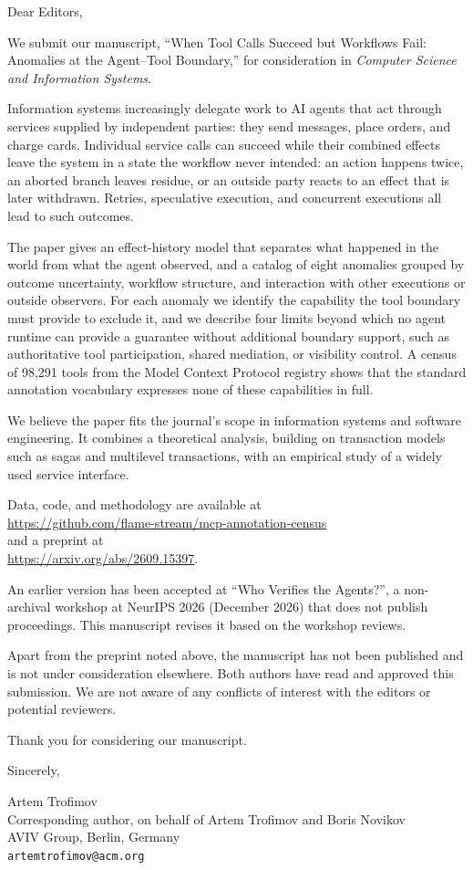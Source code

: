\documentclass[11pt,a4paper]{article}
\begin{document}
\noindent Dear Editors,

We submit our manuscript, ``When Tool Calls Succeed but Workflows Fail:
Anomalies at the Agent--Tool Boundary,'' for consideration in
\emph{Computer Science and Information Systems}.

Information systems increasingly delegate work to AI agents that act
through services supplied by independent parties: they send messages,
place orders, and charge cards. Individual service calls can succeed while
their combined effects leave the system in a state the workflow never
intended: an action happens twice, an aborted branch leaves residue, or an
outside party reacts to an effect that is later withdrawn. Retries,
speculative execution, and concurrent executions all lead to such
outcomes.

The paper gives an effect-history model that separates what happened in
the world from what the agent observed, and a catalog of eight anomalies
grouped by outcome uncertainty, workflow structure, and interaction with
other executions or outside observers. For each anomaly we identify the
capability the tool boundary must provide to exclude it, and we describe
four limits beyond which no agent runtime can provide a guarantee
without additional boundary support, such as authoritative tool
participation, shared mediation, or visibility control. A census of
98,291 tools from the Model Context Protocol registry shows that the
standard annotation vocabulary expresses none of these capabilities in
full.

We believe the paper fits the journal's scope in information systems and
software engineering. It combines a theoretical analysis, building on
transaction models such as sagas and multilevel transactions, with an
empirical study of a widely used service interface.

Data, code, and methodology are available at\\
\url{https://github.com/flame-stream/mcp-annotation-census}\\
and a preprint at\\
\url{https://arxiv.org/abs/2609.15397}.

An earlier version has been accepted at ``Who Verifies the
Agents?'', a non-archival workshop at NeurIPS 2026 (December 2026) that
does not publish proceedings. This manuscript revises it based on the
workshop reviews.

Apart from the preprint noted above, the manuscript has not been
published and is not under consideration elsewhere. Both authors have
read and approved this submission. We are not aware of any conflicts of
interest with the editors or potential reviewers.

Thank you for considering our manuscript.

\vspace{1em}

\noindent Sincerely,

\vspace{0.5em}

\noindent Artem Trofimov\\
Corresponding author, on behalf of Artem Trofimov and Boris Novikov\\
AVIV Group, Berlin, Germany\\
\texttt{artemtrofimov@acm.org}
\end{document}
